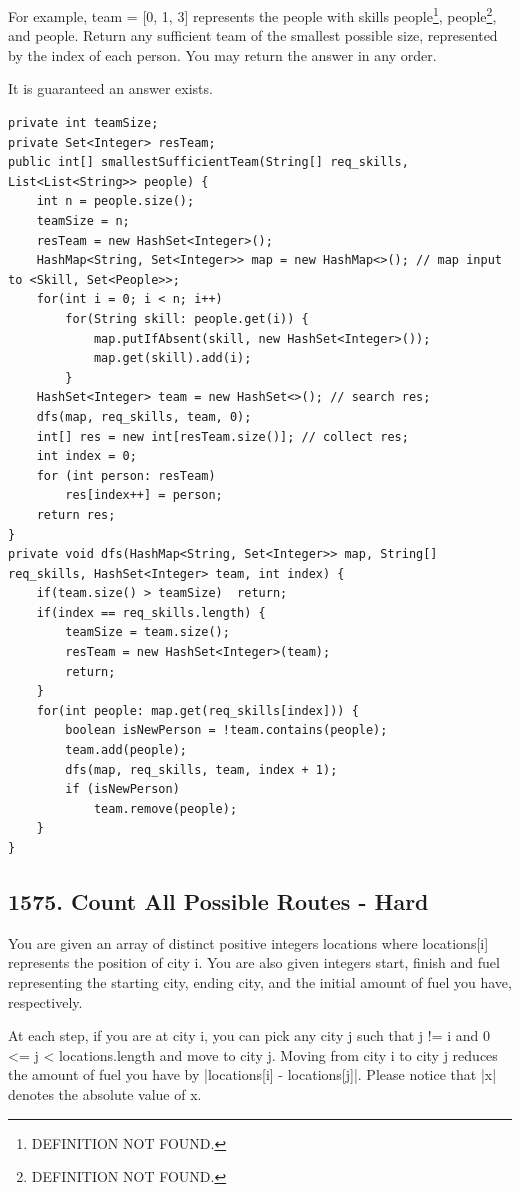 \documentclass[9pt, b5paper]{article}
\begin{document}
For example, team = [0, 1, 3] represents the people with skills people\footnote{DEFINITION NOT FOUND.}, people\footnote{DEFINITION NOT FOUND.}, and people\footnotemark[1]{}.
Return any sufficient team of the smallest possible size, represented by the index of each person. You may return the answer in any order.

It is guaranteed an answer exists.
\begin{verbatim}
private int teamSize;
private Set<Integer> resTeam; 
public int[] smallestSufficientTeam(String[] req_skills, List<List<String>> people) {
    int n = people.size();
    teamSize = n;
    resTeam = new HashSet<Integer>();
    HashMap<String, Set<Integer>> map = new HashMap<>(); // map input to <Skill, Set<People>>;
    for(int i = 0; i < n; i++) 
        for(String skill: people.get(i)) {
            map.putIfAbsent(skill, new HashSet<Integer>());
            map.get(skill).add(i);
        }
    HashSet<Integer> team = new HashSet<>(); // search res;
    dfs(map, req_skills, team, 0);
    int[] res = new int[resTeam.size()]; // collect res;
    int index = 0;
    for (int person: resTeam) 
        res[index++] = person;
    return res;
}
private void dfs(HashMap<String, Set<Integer>> map, String[] req_skills, HashSet<Integer> team, int index) {
    if(team.size() > teamSize)  return;
    if(index == req_skills.length) {
        teamSize = team.size();
        resTeam = new HashSet<Integer>(team);
        return;
    }
    for(int people: map.get(req_skills[index])) {
        boolean isNewPerson = !team.contains(people);
        team.add(people);
        dfs(map, req_skills, team, index + 1);
        if (isNewPerson) 
            team.remove(people);
    }
}
\end{verbatim}

\subsection{1575. Count All Possible Routes - Hard}
\label{sec-4-2}
You are given an array of distinct positive integers locations where locations[i] represents the position of city i. You are also given integers start, finish and fuel representing the starting city, ending city, and the initial amount of fuel you have, respectively.

At each step, if you are at city i, you can pick any city j such that j != i and 0 <= j < locations.length and move to city j. Moving from city i to city j reduces the amount of fuel you have by |locations[i] - locations[j]|. Please notice that |x| denotes the absolute value of x.
\end{document}
